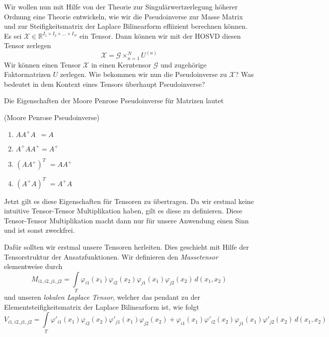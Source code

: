 Wir wollen nun mit Hilfe von der Theorie zur Singulärwertzerlegung höherer Ordnung eine Theorie entwickeln, wie wir die Pseudoinverse zur Masse Matrix und zur Steifigkeitsmatrix der Laplace Bilinearform effiizient berechnen können. 
Es sei $\pmb{\mathscr{X}}  \in \mathbb{R}^{I_1 \times I_2 \times \dots \times I_N}$ ein Tensor. Dann können wir mit der HOSVD diesen Tensor zerlegen
\begin{equation}
\pmb{\mathscr{X}} = \pmb{\mathscr{G}} \times_{n=1}^{N} U^{ (n) }
\end{equation}
Wir können einen Tensor $\pmb{\mathscr{X}}$ in einen Kerntensor $\pmb{\mathscr{G}}$ und zugehörige Faktormatrizen $U$ zerlegen. Wie bekommen wir nun die Pseudoinverse zu $\pmb{\mathscr{X}}$? Was bedeutet in dem Kontext eines Tensors überhaupt Pseudoinverse?

Die Eigenschaften der Moore Penrose Pseudoinverse für Matrizen lautet
\begin{Lemma} (Moore Penrose Pseudoinverse) \label{lemma:penrose}
\begin{enumerate}
\item $AA^{+}A \, \, \, =A$
\item $A^{+}AA^{+}=A^{+}$ 
\item $(AA^{+})^{T} \, \,  =AA^{+}$
\item $(A^{+}A)^{T} \, \, =A^{+}A$ 
\end{enumerate}
\end{Lemma}

Jetzt gilt es diese Eigenschaften für Tensoren zu übertragen. Da wir erstmal keine intuitive Tensor-Tensor Multiplikation haben, gilt es diese zu definieren. Diese Tensor-Tensor Multiplikation macht dann nur für unsere Anwendung einen Sinn und ist sonst zweckfrei.

Dafür sollten wir erstmal unsere Tensoren herleiten. Dies geschieht mit Hilfe der Tensorstruktur der Ansatzfunktionen.
Wir definieren den \textit{Massetensor} elementweise durch
\begin{equation} 
M_{i1,i2,j1,j2} = \int\limits_{T} \varphi_{i1} (x_1) \varphi_{i2}(x_2) \varphi_{j1} (x_1) \varphi_{j2} (x_2) \, d(x_1,x_2)
\end{equation}
und unseren \textit{lokalen Laplace Tensor}, welcher das pendant zu der Elementsteifigkeitsmatrix der Laplace Bilinearform ist, wie folgt
\begin{equation} 
V_{i1,i2,j1,j2} = \int\limits_{T} \varphi'_{i1} (x_1) \varphi_{i2}(x_2) \varphi'_{j1} (x_1) \varphi_{j2} (x_2) +
\varphi_{i1} (x_1) \varphi'_{i2}(x_2) \varphi_{j1} (x_1) \varphi'_{j2} (x_2) \, d(x_1,x_2)
\end{equation}

